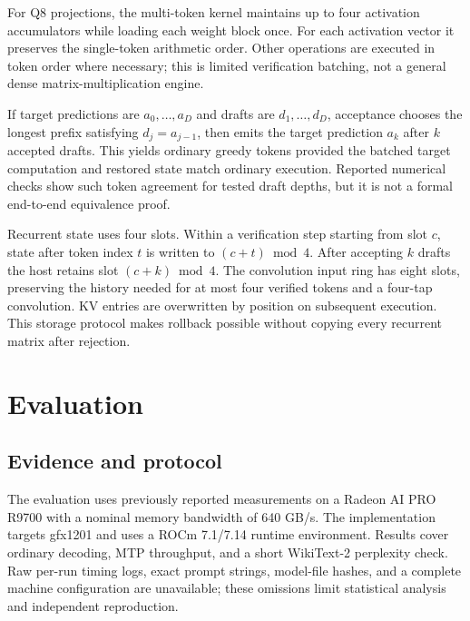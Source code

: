 \documentclass[10pt]{article}
\begin{document}
For Q8 projections, the multi-token kernel maintains up to four activation accumulators while loading each weight block once. For each activation vector it preserves the single-token arithmetic order. Other operations are executed in token order where necessary; this is limited verification batching, not a general dense matrix-multiplication engine.

If target predictions are $a_0,\ldots,a_D$ and drafts are $d_1,\ldots,d_D$, acceptance chooses the longest prefix satisfying $d_j=a_{j-1}$, then emits the target prediction $a_k$ after $k$ accepted drafts. This yields ordinary greedy tokens provided the batched target computation and restored state match ordinary execution. Reported numerical checks show such token agreement for tested draft depths, but it is not a formal end-to-end equivalence proof.

Recurrent state uses four slots. Within a verification step starting from slot $c$, state after token index $t$ is written to $(c+t)\bmod4$. After accepting $k$ drafts the host retains slot $(c+k)\bmod4$. The convolution input ring has eight slots, preserving the history needed for at most four verified tokens and a four-tap convolution. KV entries are overwritten by position on subsequent execution. This storage protocol makes rollback possible without copying every recurrent matrix after rejection.

\section{Evaluation}
\subsection{Evidence and protocol}
The evaluation uses previously reported measurements on a Radeon AI PRO R9700 with a nominal memory bandwidth of 640 GB/s. The implementation targets gfx1201 and uses a ROCm 7.1/7.14 runtime environment. Results cover ordinary decoding, MTP throughput, and a short WikiText-2 perplexity check. Raw per-run timing logs, exact prompt strings, model-file hashes, and a complete machine configuration are unavailable; these omissions limit statistical analysis and independent reproduction.
\end{document}
